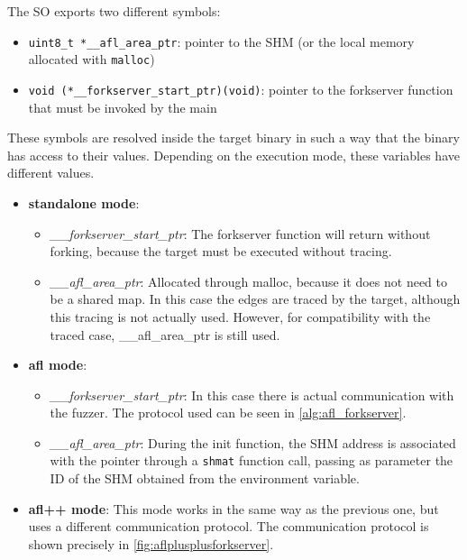 The \gls{SO} exports two different symbols:
\begin{itemize}
    \item \texttt{uint8\_t *\_\_afl\_area\_ptr}: pointer to the \gls{SHM} (or the local memory allocated with 
        \texttt{malloc})
    \item \texttt{void (*\_\_forkserver\_start\_ptr)(void)}: pointer to the forkserver function that 
        must be invoked by the main
\end{itemize}
These symbols are resolved inside the target binary in such a way that the binary has access to their values.
Depending on the execution mode, these variables have different values.
\begin{itemize}
    \item \textbf{standalone mode}:\begin{itemize}
        \item \textit{\_\_forkserver\_start\_ptr}: The forkserver function will return without forking, because 
            the target must be executed without tracing. 
        \item \textit{\_\_afl\_area\_ptr}: Allocated through malloc, because it does not need to be a shared map. 
            In this case the edges are traced by the target, although this tracing is not actually used.
            However, for compatibility with the traced case, \_\_afl\_area\_ptr is still used.
    \end{itemize}
    \item \textbf{afl mode}:\begin{itemize}
        \item \textit{\_\_forkserver\_start\_ptr}: In this case there is actual communication with the fuzzer. 
            The protocol used can be seen in \cref{alg:afl_forkserver}.
            
        \item \textit{\_\_afl\_area\_ptr}: During the init function, the \gls{SHM} address is associated with the pointer 
            through a \texttt{shmat} function call, passing as parameter the ID of the \gls{SHM} obtained from 
            the environment variable.
    \end{itemize}
    \item \textbf{afl++ mode}: This mode works in the same way as the previous one, but uses a different communication protocol.
        The communication protocol is shown precisely in \cref{fig:aflplusplusforkserver}.
        
\end{itemize}

